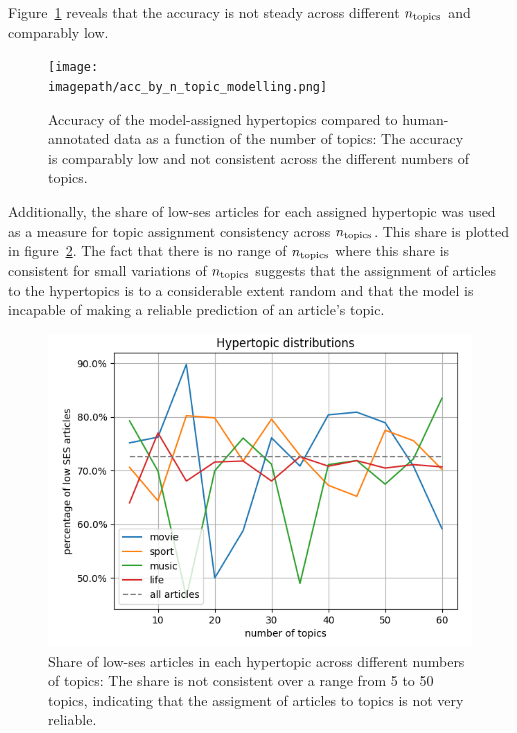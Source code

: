 Figure~\ref{fig:accuracy_by_ntopics} reveals that the accuracy is not steady across different $n_\text{topics}$ and comparably low.

\begin{figure}
    \centering
    \texttt{[image: \\imagepath/acc\_by\_n\_topic\_modelling.png]}
    \caption{Accuracy of the model-assigned hypertopics compared to human-annotated data as a function of the number of topics: The accuracy is comparably low and not consistent across the different numbers of topics.}\label{fig:accuracy_by_ntopics}
\end{figure}

Additionally, the share of low-\gls{ses} articles for each assigned hypertopic was used as a measure for topic assignment consistency across $n_\text{topics}$. This share is plotted in figure~\ref{fig:lowshare_per_ntopics}. The fact that there is no range of $n_\text{topics}$ where this share is consistent for small variations of $n_\text{topics}$ suggests that the assignment of articles to the hypertopics is to a considerable extent random and that the model is incapable of making a reliable prediction of an article's topic.

\begin{figure}
    \centering
    \includegraphics[scale=0.5]{img/low_ses_by_n_topic_modelling.png}
    \caption{Share of low-\gls{ses} articles in each hypertopic across different numbers of topics: The share is not consistent over a range from \SI{5}{} to \SI{50}{} topics, indicating that the assigment of articles to topics is not very reliable.}\label{fig:lowshare_per_ntopics}
\end{figure}

